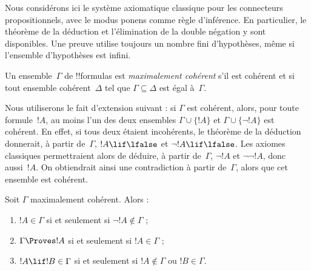 \documentclass[../../../include/open-logic-section]{subfiles}
\begin{document}


Nous considérons ici le système axiomatique classique
pour les connecteurs propositionnels, avec le modus ponens
comme règle d'inférence. En particulier, le théorème de
la déduction et l'élimination de la double négation y sont
disponibles. Une preuve utilise toujours un nombre fini
d'hypothèses, même si l'ensemble d'hypothèses est infini.

\begin{defn}
Un ensemble~$\Gamma$ de !!{formula}s est
\emph{maximalement cohérent} s'il est cohérent
et si tout ensemble cohérent~$\Delta$ tel que
$\Gamma\subseteq\Delta$ est égal à~$\Gamma$.
\end{defn}

Nous utiliserons le fait d'extension suivant :
si $\Gamma$ est cohérent, alors, pour toute formule~$!A$,
au moins l'un des deux ensembles
$\Gamma\cup\{!A\}$ et $\Gamma\cup\{\lnot !A\}$
est cohérent. En effet, si tous deux étaient incohérents,
le théorème de la déduction donnerait, à partir de~$\Gamma$,
$!A\lif\lfalse$ et
$\lnot !A\lif\lfalse$. Les axiomes classiques
permettraient alors de déduire, à partir de~$\Gamma$,
$\lnot !A$ et $\lnot\lnot !A$, donc aussi~$!A$.
On obtiendrait ainsi une contradiction à partir de~$\Gamma$,
alors que cet ensemble est cohérent.

\begin{lem}
Soit $\Gamma$ maximalement cohérent. Alors :
\begin{enumerate}
\item {} $!A \in \Gamma$ si et seulement si
  $\lnot !A \notin \Gamma$ ;
\item {} $\Gamma \Proves !A$ si et seulement si
  $!A \in \Gamma$ ;
\item {} $!A \lif !B \in \Gamma$ si et seulement si
  $!A \notin \Gamma$ ou $!B \in \Gamma$.
\end{enumerate}
\end{lem}
\end{document}
